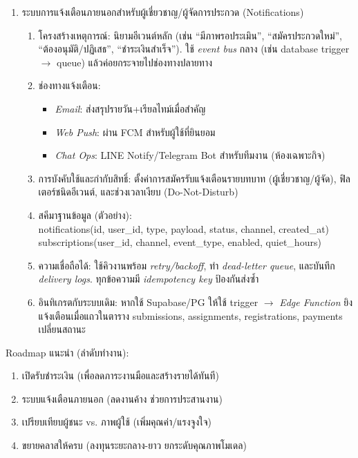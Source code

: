 \begin{sloppypar}
\begin{enumerate}
		\item ระบบการแจ้งเตือนภายนอกสำหรับผู้เชี่ยวชาญ/ผู้จัดการประกวด (Notifications)
		\begin{enumerate}
			\item โครงสร้างเหตุการณ์: นิยามอีเวนต์หลัก (เช่น ``มีภาพรอประเมิน'', ``สมัครประกวดใหม่'', ``ต้องอนุมัติ/ปฏิเสธ'', ``ชำระเงินสำเร็จ''). ใช้ \emph{event bus} กลาง (เช่น database trigger $\rightarrow$ queue) แล้วค่อยกระจายไปช่องทางปลายทาง
			\item ช่องทางแจ้งเตือน: 
			\begin{itemize}
				\item \emph{Email}: ส่งสรุปรายวัน+เรียลไทม์เมื่อสำคัญ
				\item \emph{Web Push}: ผ่าน FCM สำหรับผู้ใช้ที่ยินยอม
				\item \emph{Chat Ops}: LINE Notify/Telegram Bot สำหรับทีมงาน (ห้องเฉพาะกิจ)
			\end{itemize}
			\item การบังคับใช้และกำกับสิทธิ์: ตั้งค่าการสมัครรับแจ้งเตือนรายบทบาท (ผู้เชี่ยวชาญ/ผู้จัด), ฟิลเตอร์ชนิดอีเวนต์, และช่วงเวลาเงียบ (Do-Not-Disturb)
			\item สคีมาฐานข้อมูล (ตัวอย่าง): \\
			notifications(id, user\_id, type, payload, status, channel, created\_at) \\
			subscriptions(user\_id, channel, event\_type, enabled, quiet\_hours)
			\item ความเชื่อถือได้: ใช้คิวงานพร้อม \emph{retry/backoff}, ทำ \emph{dead-letter queue}, และบันทึก \emph{delivery logs}. ทุกข้อความมี \emph{idempotency key} ป้องกันส่งซ้ำ
			\item อินทิเกรตกับระบบเดิม: หากใช้ Supabase/PG ให้ใช้ trigger $\rightarrow$ \emph{Edge Function} ยิงแจ้งเตือนเมื่อแถวในตาราง submissions, assignments, registrations, payments เปลี่ยนสถานะ
		\end{enumerate}
	\end{enumerate}
	
	\vspace{0.5em}
	\noindent Roadmap แนะนำ (ลำดับทำงาน): 
	\begin{enumerate}
		\item เปิดรับชำระเงิน (เพื่อลดภาระงานมือและสร้างรายได้ทันที)
		\item ระบบแจ้งเตือนภายนอก (ลดงานค้าง ช่วยการประสานงาน)
		\item เปรียบเทียบผู้ชนะ vs. ภาพผู้ใช้ (เพิ่มคุณค่า/แรงจูงใจ)
		\item ขยายคลาสให้ครบ (ลงทุนระยะกลาง-ยาว ยกระดับคุณภาพโมเดล)
	\end{enumerate}
\end{sloppypar}
